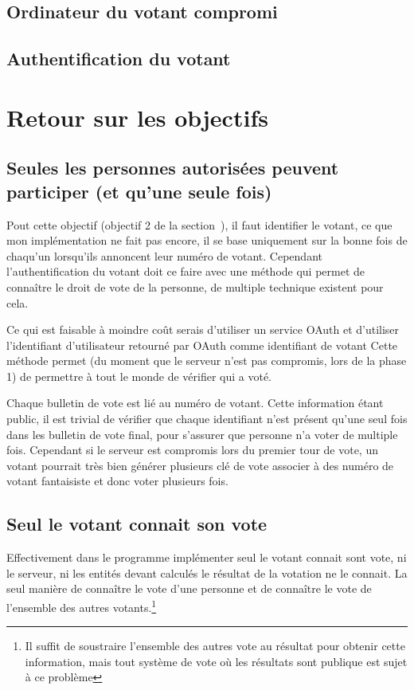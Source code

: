 \documentclass[../report]{subfiles}
\begin{document}
\section{Ordinateur du votant compromi}

\section{Authentification du votant}

\chapter{Retour sur les objectifs}

\section{Seules les personnes autorisées peuvent participer (et qu'une seule fois)}

Pout cette objectif (objectif 2 de la section~),
il faut identifier le votant, ce que mon implémentation ne fait pas encore, il se base 
uniquement sur la bonne fois de chaqu'un lorsqu'ils annoncent leur numéro de votant.
Cependant l'authentification du votant doit ce faire avec une méthode qui permet de connaître
le droit de vote de la personne, de multiple technique existent pour cela.

Ce qui est faisable à moindre coût serais d'utiliser un service OAuth et d'utiliser l'identifiant
d'utilisateur retourné par OAuth comme identifiant de votant
Cette méthode permet (du moment que le serveur n'est pas compromis, lors de la phase 1) de permettre
à tout le monde de vérifier qui a voté.

Chaque bulletin de vote est lié au numéro de votant. 
Cette information étant public, il est trivial de vérifier que chaque identifiant n'est présent
qu'une seul fois dans les bulletin de vote final, pour s'assurer que personne n'a voter de 
multiple fois.
Cependant si le serveur est compromis lors du premier tour de vote, un votant pourrait très bien
générer plusieurs clé de vote associer à des numéro de votant fantaisiste et donc voter 
plusieurs fois.

\section{Seul le votant connait son vote}

Effectivement dans le programme implémenter seul le votant connait sont vote, ni le serveur, 
ni les entités devant calculés le résultat de la votation ne le connait.
La seul manière de connaître le vote d'une personne et de connaître le vote de l'ensemble 
des autres votants.\footnote{Il suffit de soustraire l'ensemble des autres vote au résultat
pour obtenir cette information, mais tout système de vote où les résultats sont publique est
sujet à ce problème}
\end{document}
